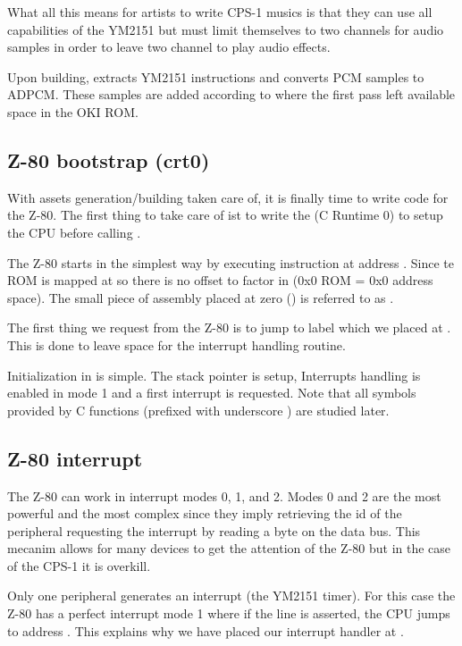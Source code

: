 What all this means for artists to write CPS-1 musics is that they can use all capabilities of the YM2151 but must limit themselves to two channels for audio samples in order to leave two channel to play audio effects. 

Upon building,  extracts YM2151 instructions and converts PCM samples to ADPCM. These samples are added according to where the first pass left available space in the OKI ROM.


\subsection{Z-80 bootstrap (crt0)}

With assets generation/building taken care of, it is finally time to write code for the Z-80. The first thing to take care of ist to write the  (C Runtime 0) to setup the CPU before calling .

The Z-80 starts in the simplest way by executing instruction at address . Since te ROM is mapped at  so there is no offset to factor in (0x0 ROM = 0x0 address space). The small piece of assembly placed at zero () is referred to as .
\pagebreak



The first thing we request from the Z-80 is to jump to label  which we placed at . This is done to leave space for the interrupt handling routine.

Initialization in  is simple. The stack pointer  is setup, Interrupts handling is enabled in mode 1 and a first interrupt is requested. Note that all symbols provided by C functions (prefixed with underscore \icode{\_}) are studied later.

\subsection{Z-80 interrupt}
The Z-80 can work in interrupt modes 0, 1, and 2. Modes 0 and 2 are the most powerful and the most complex since they imply retrieving the id of the peripheral requesting the interrupt by reading a byte on the data bus. This mecanim allows for many devices to get the attention of the Z-80 but in the case of the CPS-1 it is overkill. 

Only one peripheral generates an interrupt (the YM2151 timer). For this case the Z-80 has a perfect interrupt mode 1 where if the  line is asserted, the CPU jumps to address . This explains why we have placed our interrupt handler at .

